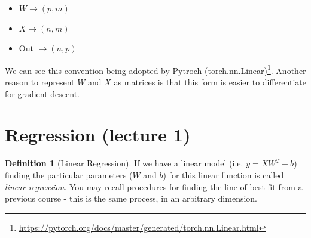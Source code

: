 \documentclass[11pt]{article}
\numberwithin{equation}{section}
\theoremstyle{definition}%
\newtheorem{definition}{Definition}[section]%
\begin{document}
\begin{itemize}
    \item {$W \rightarrow (p,m)$}
    \item {$X \rightarrow (n,m)$}
    \item {Out $\rightarrow (n,p)$}
\end{itemize}

We can see this convention being adopted by Pytroch (torch.nn.Linear)\footnote{\url{https://pytorch.org/docs/master/generated/torch.nn.Linear.html}}. Another reason to represent $W$ and $X$ as matrices is that this form is easier to differentiate for gradient descent.

\section{Regression (lecture 1)}
\begin{definition}[Linear Regression]

If we have a linear model (i.e. $y=XW^T+b$) finding the particular parameters ($W$ and $b$) for this linear function is called \emph{linear regression}. You may recall procedures for finding the line of best fit from a previous course - this is the same process, in an arbitrary dimension.
\end{definition}
\end{document}
